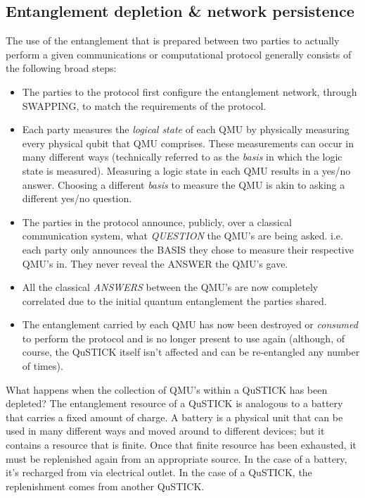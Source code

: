 \documentclass[twocolumn, aps, rmp, amsmath, amssymb, nofootinbib, superscriptaddress, longbibliography, floatfix, table-of-contents, eqsecnum]{revtex4-2}
\begin{document}
\subsection{Entanglement depletion \& network persistence}

The use of the entanglement that is prepared between two parties to actually perform a given communications or computational protocol generally consists of the following broad steps: 
\begin{itemize}
\item The parties to the protocol first configure the entanglement network, through SWAPPING, to match the requirements of the protocol.
\item Each party measures the \textit{logical state} of each QMU by physically measuring every physical qubit that QMU comprises. These measurements can occur in many different ways (technically referred to as the \textit{basis} in which the logic state is measured). Measuring a logic state in each QMU results in a yes/no answer. Choosing a different \textit{basis} to measure the QMU is akin to asking a different yes/no question. 
\item The parties in the protocol announce, publicly, over a classical communication system, what \textit{QUESTION} the QMU's are being asked. i.e. each party only announces the BASIS they chose to measure their respective QMU's in. They never reveal the ANSWER the QMU's gave. 
\item All the classical \textit{ANSWERS} between the QMU's are now completely correlated due to the initial quantum entanglement the parties shared. 
\item The entanglement carried by each QMU has now been destroyed or \textit{consumed} to perform the protocol and is no longer present to use again (although, of course, the QuSTICK itself isn't affected and can be re-entangled any number of times). 
\end{itemize}

What happens when the collection of QMU's within a QuSTICK has been depleted? The entanglement resource of a QuSTICK is analogous to a battery that carries a fixed amount of charge. A battery is a physical unit that can be used in many different ways and moved around to different devices; but it contains a resource that is finite. Once that finite resource has been exhausted, it must be replenished again from an appropriate source. In the case of a battery, it's recharged from via electrical outlet. In the case of a QuSTICK, the replenishment comes from another QuSTICK.
\end{document}
